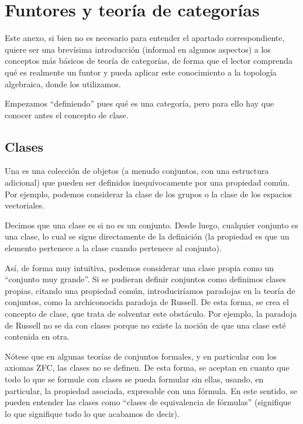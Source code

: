 \chapter{Funtores y teoría de categorías}
\label{funt}

Este anexo, si bien no es necesario para entender el apartado correspondiente, quiere ser una brevísima introducción (informal en algunos aspectos) a los conceptos más básicos de teoría de categorías, de forma que el lector comprenda qué es realmente un funtor y pueda aplicar este conocimiento a la topología algebraica, donde los utilizamos. 

Empezamos ``definiendo'' pues qué es una categoría, pero para ello hay que conocer antes el concepto de clase.

\section{Clases}

\begin{defi}[Clase]
Una  es una colección de objetos (a menudo conjuntos, con una estructura adicional) que pueden ser definidos inequívocamente por una propiedad común. Por ejemplo, podemos considerar la clase de los grupos o la clase de los espacios vectoriales.
\end{defi}

\begin{obs}
Decimos que una clase es  si no es un conjunto. Desde luego, cualquier conjunto es una clase, lo cual se sigue directamente de la definición (la propiedad es que un elemento pertenece a la clase cuando pertenece al conjunto).

Así, de forma muy intuitiva, podemos considerar una clase propia como un ``conjunto muy grande''. Si se pudieran definir conjuntos como definimos clases propias, citando una propiedad común, introduciríamos paradojas en la teoría de conjuntos, como la archiconocida paradoja de Russell. De esta forma, se crea el concepto de clase, que trata de solventar este obstáculo. Por ejemplo, la paradoja de Russell no se da con clases porque no existe la noción de que una clase esté contenida en otra.

Nótese que en algunas teorías de conjuntos formales, y en particular con los axiomas ZFC, las clases no se definen. De esta forma, se aceptan en cuanto que todo lo que se formule con clases se pueda formular sin ellas, usando, en particular, la propiedad asociada, expresable con una fórmula. En este sentido, se pueden entender las clases como ``clases de equivalencia de fórmulas'' (signifique lo que signifique todo lo que acabamos de decir).
\end{obs}

